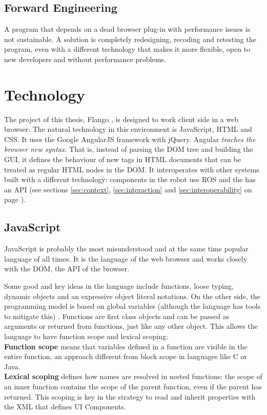 \subsection{Forward Engineering} A program that depends on a dead browser plug-in with performance issues is not sustainable.
A solution is completely  redesigning, recoding and retesting the program, even with a different technology that makes it more flexible, open to new developers and without performance problems.


\section{Technology}
The project of this thesis, Flango \cm, is designed to work client side in a web browser.
The natural technology in this environment is JavaScript, \ac{HTML} and \ac{CSS}.
It uses the Google AngularJS framework with jQuery.
Angular \textit{teaches the browser new syntax}.
That is, instead of parsing the \ac{DOM} tree and building the \ac{GUI}, it defines the behaviour of new tags in \ac{HTML} documents that can be treated as regular \ac{HTML} nodes in the \ac{DOM}.
It interoperates with other systems built with a different technology: components in the robot use \ac{ROS} and the \flangobe has an \ac{API} (see sections \ref{sec:context}, \ref{sec:interaction} and \ref{sec:interoperability} on page \pageref{sec:context}).

\subsection{JavaScript}
JavaScript is probably the most misunderstood and at the same time popular language of all times.
It is the language of the web browser and works closely with the \ac{DOM}, the \ac{API} of the browser.

Some good and key ideas in the language include functions, loose typing, dynamic objects and an expressive object literal notations.
On the other side, the programming model is based on global variables (although the language has tools to mitigate this) \cite{Crockford}.
Functions are first class objects and can be passed as arguments or returned from functions, just like any other object.
This allows the language to have function scope and lexical scoping: \\
\textbf{Function scope} means that variables defined in a function are visible in the entire function, an approach different from block scope in languages like C or Java.\\
\textbf{Lexical scoping} defines how names are resolved in nested functions: the scope of an inner function contains the scope of the parent function, even if the parent has returned.
This scoping is key in the strategy to read and inherit properties with the \ac{XML} that defines UI Components.

